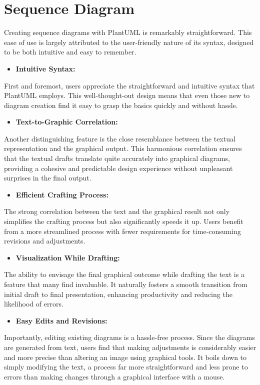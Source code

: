 %
%
\section{Sequence Diagram}


Creating sequence diagrams with PlantUML is remarkably straightforward. This ease of use is largely attributed to the user-friendly nature of its syntax, designed to be both intuitive and easy to remember.


\begin{itemize}
\item \textbf{Intuitive Syntax:} 
\end{itemize}
  First and foremost, users appreciate the straightforward and intuitive syntax that PlantUML employs. This well-thought-out design means that even those new to diagram creation find it easy to grasp the basics quickly and without hassle.


\begin{itemize}
\item \textbf{Text-to-Graphic Correlation:} 
\end{itemize}
  Another distinguishing feature is the close resemblance between the textual representation and the graphical output. This harmonious correlation ensures that the textual drafts translate quite accurately into graphical diagrams, providing a cohesive and predictable design experience without unpleasant surprises in the final output.


\begin{itemize}
\item \textbf{Efficient Crafting Process:} 
\end{itemize}
  The strong correlation between the text and the graphical result not only simplifies the crafting process but also significantly speeds it up. Users benefit from a more streamlined process with fewer requirements for time-consuming revisions and adjustments.


\begin{itemize}
\item \textbf{Visualization While Drafting:} 
\end{itemize}
  The ability to envisage the final graphical outcome while drafting the text is a feature that many find invaluable. It naturally fosters a smooth transition from initial draft to final presentation, enhancing productivity and reducing the likelihood of errors.


\begin{itemize}
\item \textbf{Easy Edits and Revisions:} 
\end{itemize}
  Importantly, editing existing diagrams is a hassle-free process. Since the diagrams are generated from text, users find that making adjustments is considerably easier and more precise than altering an image using graphical tools. It boils down to simply modifying the text, a process far more straightforward and less prone to errors than making changes through a graphical interface with a mouse.


